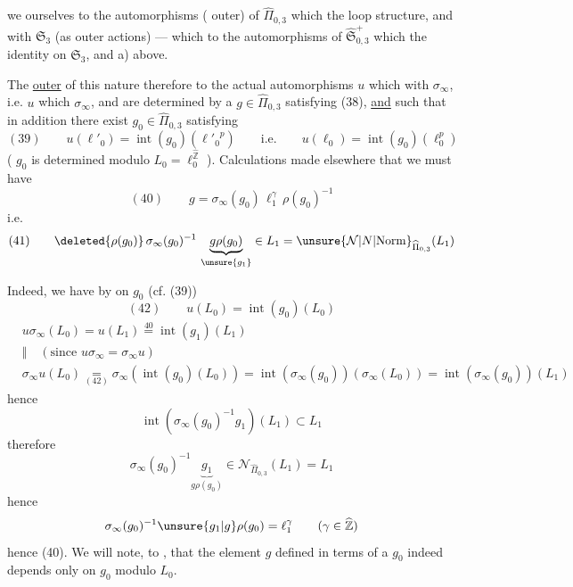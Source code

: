 

 we  ourselves to the automorphisms
( outer) of $\widehat{\Pi}_{0,3}$
which  the loop structure, and  with
$\mathfrak S_3$ (as outer actions)
--- which  to the automorphisms
 of
$\widehat{\mathfrak S}_{0,3}^{+}$ which 
the identity on $\mathfrak S_3$,
and  a) above. 

The \uline{outer}  of this nature
 therefore to the actual automorphisms $u$
which  with $\sigma_\infty$, i.e. $u$
 which
 $\sigma_\infty$, and are determined by a
$g\in\widehat{\Pi}_{0,3}$ satisfying (38), \uline{and} such that
in addition there exist 
$g_0\in\widehat{\Pi}_{0,3}$ satisfying
\[
(39)\qquad
u(\ell'_0)=\operatorname{int}(g_0)({\ell'_0}^{p})
\qquad\text{i.e.}\qquad
u(\ell_0)=\operatorname{int}(g_0)(\ell_0^{p})
\]
( $g_0$ is determined modulo $L_0=\ell_0^{\widehat{\mathbb Z}}$
\unsure{\ldots}). Calculations made elsewhere 
 that we must have
\[
(40)\qquad g=\sigma_\infty(g_0)\,\ell_1^{\gamma}\,\rho(g_0)^{-1}
\]
i.e.
\[
(41)\qquad
\deleted{\rho(g_0)}\,\sigma_\infty(g_0)^{-1}\,
\underbrace{g\rho(g_0)}_{\unsure{g_1}}\in L_1
=\unsure{\mathcal N|N|\mathrm{Norm}}_{\widehat{\Pi}_{0,3}}(L_1)
\]


Indeed, we have by  on $g_0$ (cf. (39))
\[
(42)\qquad u(L_0)=\operatorname{int}(g_0)(L_0)
\]
\[
\begin{aligned}
&u\sigma_\infty(L_0)=u(L_1)\overset{40}{=}
  \operatorname{int}(g_1)(L_1)\\
&\Vert\quad(\text{since }u\sigma_\infty=\sigma_\infty u)\\
&\sigma_\infty u(L_0)\underset{(42)}{=}
 \sigma_\infty(\operatorname{int}(g_0)(L_0))
 =\operatorname{int}(\sigma_\infty(g_0))(\sigma_\infty(L_0))
 =\operatorname{int}(\sigma_\infty(g_0))(L_1)
\end{aligned}
\]
hence
\[
\operatorname{int}(\sigma_\infty(g_0)^{-1}g_1)(L_1)\subset L_1
\]
therefore
\[
\sigma_\infty(g_0)^{-1}\underbrace{g_1}_{g\rho(g_0)}
\in \mathcal N_{\widehat{\Pi}_{0,3}}(L_1)=L_1
\]
hence
\[
\sigma_\infty(g_0)^{-1}\unsure{g_1|g}\rho(g_0)=\ell_1^\gamma
\qquad (\gamma\in\widehat{\mathbb Z})
\]
hence (40). We will note, to , that the element $g$
defined in terms of a $g_0$  \margin{$\checkmark$}
indeed depends only on $g_0$ modulo $L_0$. 

